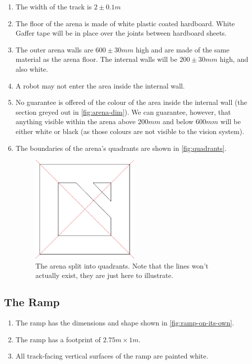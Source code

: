 \begin{enumerate}
\item The width of the track is $2\pm0.1m$
\item The floor of the arena is made of white plastic coated hardboard.
 White Gaffer tape will be in place over the joints between hardboard sheets.
\item The outer arena walls are $600\pm30mm$ high and are made of the same material as the arena floor.
 The internal walls will be $200\pm30mm$ high, and also white.
\item A robot may not enter the area inside the internal wall.
\item No guarantee is offered of the colour of the area inside the internal wall (the section greyed out in \autoref{fig:arena-dim}).
 We can guarantee, however, that anything visible within the arena above $200mm$ and below $600mm$ will be either white or black (as those colours are not visible to the vision system).
\item The boundaries of the arena's quadrants are shown in \autoref{fig:quadrants}.

\begin{figure}
\begin{center}
  \includegraphics[keepaspectratio, clip, width=0.5\textwidth]{./images/quadrants.pdf}
  \caption{\label{fig:quadrants}The arena split into quadrants.
           Note that the lines won't actually exist, they are just here to illustrate.}
\end{center}
\end{figure}


\end{enumerate}

\subsection{The Ramp}
\label{sub:Ramp}
\begin {enumerate}
\item The ramp has the dimensions and shape shown in \autoref{fig:ramp-on-its-own}.
\item The ramp has a footprint of $2.75m \times 1m$.
\item All track-facing vertical surfaces of the ramp are painted white.
\end {enumerate}

